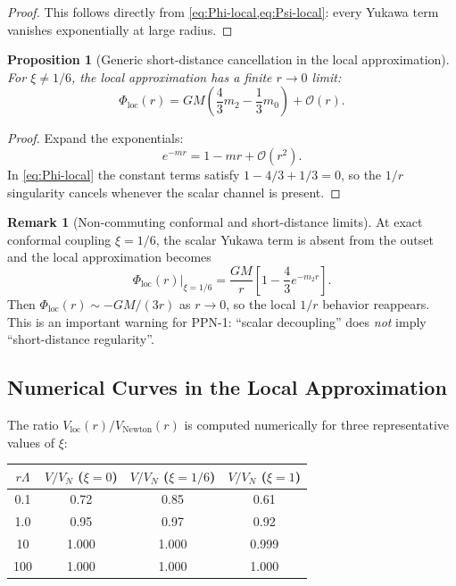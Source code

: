 \documentclass[11pt,a4paper]{article}
\theoremstyle{plain}
\newtheorem{proposition}[theorem]{Proposition}
\theoremstyle{definition}
\newtheorem{remark}[theorem]{Remark}
\begin{document}
\begin{proof}
This follows directly from \cref{eq:Phi-local,eq:Psi-local}: every Yukawa
term vanishes exponentially at large radius.
\end{proof}

\begin{proposition}[Generic short-distance cancellation in the local approximation]
For $\xi \neq 1/6$, the local approximation has a finite $r \to 0$ limit:
\begin{equation}\label{eq:V-zero}
  \Phi_{\mathrm{loc}}(r)
  = GM\left(\frac{4}{3}m_2 - \frac{1}{3}m_0\right) + \mathcal{O}(r).
\end{equation}
\end{proposition}

\begin{proof}
Expand the exponentials:
\begin{equation}
  e^{-m r} = 1 - mr + \mathcal{O}(r^2).
\end{equation}
In \cref{eq:Phi-local} the constant terms satisfy
$1 - 4/3 + 1/3 = 0$, so the $1/r$ singularity cancels whenever the scalar
channel is present.
\end{proof}

\begin{remark}[Non-commuting conformal and short-distance limits]
At exact conformal coupling $\xi = 1/6$, the scalar Yukawa term is absent
from the outset and the local approximation becomes
\begin{equation}
  \Phi_{\mathrm{loc}}(r)\big|_{\xi=1/6}
  = \frac{GM}{r}\left[1 - \frac{4}{3}e^{-m_2 r}\right].
\end{equation}
Then $\Phi_{\mathrm{loc}}(r) \sim -GM/(3r)$ as $r \to 0$, so the local
$1/r$ behavior reappears. This is an important warning for PPN-1:
``scalar decoupling'' does \emph{not} imply ``short-distance regularity''.
\end{remark}

\subsection{Numerical Curves in the Local Approximation}

The ratio $V_{\mathrm{loc}}(r)/V_{\mathrm{Newton}}(r)$ is computed numerically
for three representative values of $\xi$:

\begin{center}
\begin{tabular}{cccc}
\toprule
$r\Lambda$ & $V/V_N$ ($\xi\!=\!0$) & $V/V_N$ ($\xi\!=\!1/6$) &
$V/V_N$ ($\xi\!=\!1$) \\
\midrule
0.1 & 0.72 & 0.85 & 0.61 \\
1.0 & 0.95 & 0.97 & 0.92 \\
10 & 1.000 & 1.000 & 0.999 \\
100 & 1.000 & 1.000 & 1.000 \\
\bottomrule
\end{tabular}
\end{center}
\end{document}
